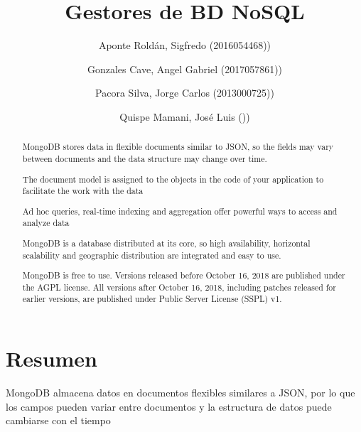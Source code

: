 \documentclass[preprint,12pt]{elsarticle}
\begin{document}
	
	\begin{frontmatter}

		\title{\huge Gestores de BD NoSQL}
		
		\author{Aponte Roldán, Sigfredo              		(2016054468))}
		\author{Gonzales Cave, Angel Gabriel              	(2017057861))} %
		\author{Pacora Silva, Jorge Carlos         		(2013000725))} %
		\author{Quispe Mamani, José Luis             		())} %
		\address{Tacna, Perú}
		
\begin{abstract}
		
MongoDB stores data in flexible documents similar to JSON, so the fields may vary between documents and the data structure may change over time.

The document model is assigned to the objects in the code of your application to facilitate the work with the data

Ad hoc queries, real-time indexing and aggregation offer powerful ways to access and analyze data

MongoDB is a database distributed at its core, so high availability, horizontal scalability and geographic distribution are integrated and easy to use.

MongoDB is free to use. Versions released before October 16, 2018 are published under the AGPL license. All versions after October 16, 2018, including patches released for earlier versions, are published under Public Server License (SSPL) v1.

\end{abstract}


	\end{frontmatter}


\section{Resumen}
MongoDB almacena datos en documentos flexibles similares a JSON, por lo que los campos pueden variar entre documentos y la estructura de datos puede cambiarse con el tiempo
\end{document}
